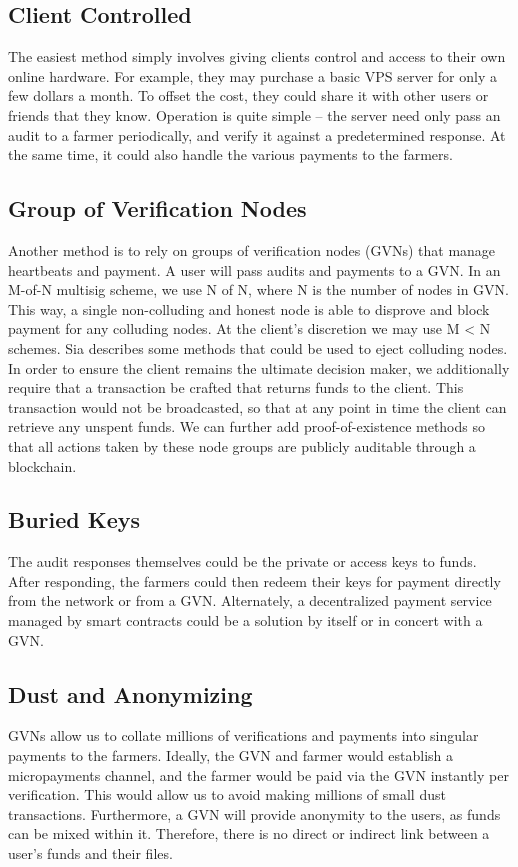 \documentclass[a4paper,10pt]{article}
\begin{document}
\subsection{Client Controlled}
The easiest method simply involves giving clients control and access to their own online hardware. For example, they may purchase a basic VPS server for only a few dollars a month. To offset the cost, they could share it with other users or friends that they know. Operation is quite simple -- the server need only pass an audit to a farmer periodically, and verify it against a predetermined response. At the same time, it could also handle the various payments to the farmers. 

\subsection{Group of Verification Nodes}
Another method is to rely on groups of verification nodes (GVNs) that manage heartbeats and payment. A user will pass audits and payments to a GVN. In an M-of-N multisig scheme, we use N of N, where N is the number of nodes in GVN. This way, a single non-colluding and honest node is able to disprove and block payment for any colluding nodes. At the client’s discretion we may use M < N schemes. Sia \cite{20} describes some methods that could be used to eject colluding nodes. In order to ensure the client remains the ultimate decision maker, we additionally require that a transaction be crafted that returns funds to the client. This transaction would not be broadcasted, so that at any point in time the client can retrieve any unspent funds. We can further add proof-of-existence methods \cite{4} \cite{5} \cite{7} so that all actions taken by these node groups are publicly auditable through a blockchain. 

\subsection{Buried Keys}
The audit responses themselves could be the private or access keys to funds. After responding, the farmers could then redeem their keys for payment directly from the network or from a GVN. Alternately, a decentralized payment service managed by smart contracts could be a solution by itself or in concert with a GVN. 

\subsection{Dust and Anonymizing}
GVNs allow us to collate millions of verifications and payments into singular payments to the farmers. Ideally, the GVN and farmer would establish a micropayments channel, and the farmer would be paid via the GVN instantly per verification. This would allow us to avoid making millions of small dust transactions. Furthermore, a GVN will provide anonymity to the users, as funds can be mixed within it. Therefore, there is no direct or indirect link between a user’s funds and their files.
\end{document}
